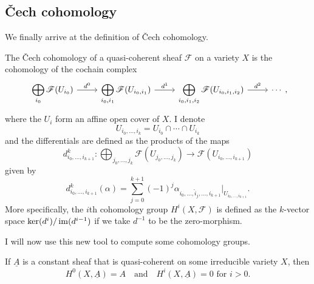 \subsection{\v Cech cohomology}\label{subsec:cech_cohomology}
We finally arrive at the definition of \v Cech cohomology.
\begin{defin}\label{def:cech}
  The \v Cech cohomology of a quasi-coherent sheaf $\mathscr{F}$ on a variety $X$
  is the cohomology of the cochain complex
  \[\begin{tikzcd}
      \displaystyle\bigoplus_{i_{0}}\mathscr{F}(U_{i_{0}})\rar{d^{0}}
      & \displaystyle\bigoplus_{i_{0},i_{1}}\mathscr{F}(U_{i_{0},i_{1}})
      \rar{d^{1}}
      & \displaystyle\bigoplus_{i_{0},i_{1},i_{2}}
      \mathscr{F}(U_{i_{0},i_{1},i_{2}})\rar{d^{2}} & \cdots
    \end{tikzcd},\]
  where the $U_i$ form an affine open cover of $X$. I denote
  \[U_{i_{0},\ldots, i_{k}}=U_{i_{0}}\cap\cdots\cap U_{i_{k}}\]
  and the differentials are defined as the products of the maps
  \[d_{i_{0},\ldots,i_{k+1}}^{k}:\displaystyle\bigoplus_{j_{0},\ldots,j_{k}}
  \mathscr{F}(U_{j_{0},\ldots,j_{k}})\to \mathscr{F}(U_{i_{0},\ldots,i_{k+1}})\]
  given by
  \[
    d_{i_{0},\ldots,i_{k+1}}^{k}(\alpha)
    =\sum_{j=0}^{k+1}(-1)^{j}\alpha_{i_{0},\ldots,\hat{i}_{j},\ldots,i_{k+1}}
    \vert_{U_{i_{0},\ldots,i_{k+1}}}.
  \]
  More specifically, the $i$th cohomology group $H^{i}(X,\mathscr{F})$
  is defined as the $k$-vector space $\ker(d^{i})/\operatorname{im}(d^{i-1})$ if we
  take $d^{-1}$ to be the zero-morphism.
\end{defin}
I will now use this new tool to compute some cohomology groups.
\begin{prop}\label{prop:const_sheaf}
  If $\underline{A}$ is a constant sheaf that is quasi-coherent on some
  irreducible variety $X$, then
  \[
    H^{0}(X,\underline{A}) = A\quad\text{and}
    \quad H^{i}(X,\underline{A})=0\text{ for }i>0.
  \]
\end{prop}
